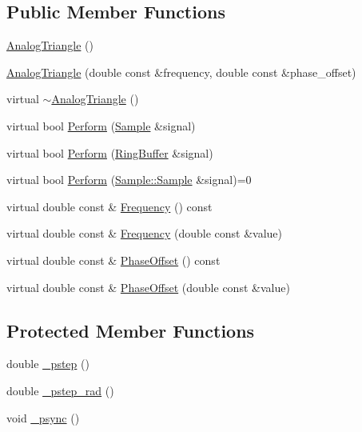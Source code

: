 \subsection*{Public Member Functions}
\begin{DoxyCompactItemize}
\item 
\hyperlink{classDSG_1_1AnalogTriangle_a42f8f20b211eb758b5b9acd4384308e2}{Analog\+Triangle} ()
\item 
\hyperlink{classDSG_1_1AnalogTriangle_aa677150201428cd206391367672454e7}{Analog\+Triangle} (double const \&frequency, double const \&phase\+\_\+offset)
\item 
virtual \hyperlink{classDSG_1_1AnalogTriangle_a9b5ed8f1759b53827b398859776210fc}{$\sim$\+Analog\+Triangle} ()
\item 
virtual bool \hyperlink{classDSG_1_1AnalogTriangle_ac3edb87c395763d6894672b471850b05}{Perform} (\hyperlink{classDSG_1_1Sample}{Sample} \&signal)
\item 
virtual bool \hyperlink{classDSG_1_1AnalogTriangle_a9456183af28d98ccf3daa85b8ad12b52}{Perform} (\hyperlink{classDSG_1_1RingBuffer}{Ring\+Buffer} \&signal)
\item 
virtual bool \hyperlink{classDSG_1_1SignalProcess_afdb8220100418893950c1161dd24db67}{Perform} (\hyperlink{classDSG_1_1Sample_aaf2e30d73911eccea99b53eeee15b612}{Sample\+::\+Sample} \&signal)=0
\item 
virtual double const \& \hyperlink{classDSG_1_1SignalGenerator_aedac746c5a70818d120858542ecb7c45}{Frequency} () const 
\item 
virtual double const \& \hyperlink{classDSG_1_1SignalGenerator_ae3ce8d45bafabbd86a0f535b15c3cd46}{Frequency} (double const \&value)
\item 
virtual double const \& \hyperlink{classDSG_1_1SignalGenerator_a1ce521847edd0b837fd840998f906b4b}{Phase\+Offset} () const 
\item 
virtual double const \& \hyperlink{classDSG_1_1SignalGenerator_a08b71b1f30ba65e629642c570291dc0e}{Phase\+Offset} (double const \&value)
\end{DoxyCompactItemize}
\subsection*{Protected Member Functions}
\begin{DoxyCompactItemize}
\item 
double \hyperlink{classDSG_1_1SignalGenerator_ac0d781b8673b3a283bf7c133290ede50}{\+\_\+pstep} ()
\item 
double \hyperlink{classDSG_1_1SignalGenerator_ae660eb4caa88b8d278f8d24d0908a487}{\+\_\+pstep\+\_\+rad} ()
\item 
void \hyperlink{classDSG_1_1SignalGenerator_a05baccb38d1e52860d4fcf7cb8430efc}{\+\_\+psync} ()
\end{DoxyCompactItemize}
